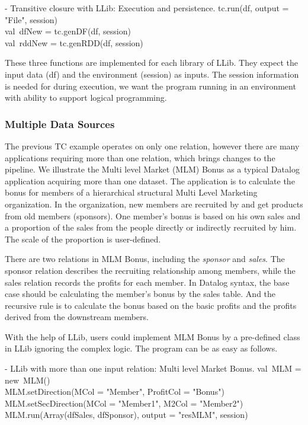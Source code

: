 \vspace{0.5em}
 - Transitive closure with LLib:  Execution and persistence.
\bldl
tc.run(df, output = "File", session) \\
val\ dfNew = tc.genDF(df, session) \\
val\ rddNew = tc.genRDD(df, session) \\

\eldl


These three functions are implemented for each library of LLib. They expect the input data (df) and the environment (session) as inputs.  The session information is needed for during execution, we want the program running in an environment with ability to support logical
programming. 


\subsubsection{Multiple Data Sources}
\label{sec:multiple}
The previous TC example operates on only one relation, however there are many applications requiring more than one relation, which brings changes to the  pipeline. We illustrate the Multi level Market (MLM) Bonus as a typical Datalog application \citep{mlm} acquiring more than one dataset. The application is to calculate the bonus for members of a hierarchical structural Multi Level Marketing  organization. In the organization,  new members are recruited by  and get products from old members (sponsors). One member's bonus is based on his own sales and a proportion of the sales from the people directly or indirectly recruited by him. The  scale of the proportion is user-defined. 

There are two relations in MLM Bonus, including the \textit{sponsor} and \textit{sales}. The sponsor relation describes the recruiting relationship among members, while the sales relation records the profits for each member. In  Datalog syntax, the base case should be calculating the member's bonus by the sales table. And the recursive rule is to calculate the bonus based on the basic profits and the profits derived from the downstream members.

With the help of LLib, users could implement MLM Bonus by a pre-defined class in LLib  ignoring the complex logic. The program can be as easy as  follows.

\vspace{0.5em}
 - LLib with more than one input relation: Multi level Market Bonus.
\bldl
val\ MLM = new\ MLM() \\
MLM.setDirection(MCol = "Member", ProfitCol = "Bonus")\\
MLM.setSecDirection(MCol = "Member1", M2Col = "Member2") \\
MLM.run(Array(dfSales, dfSponsor), output = "resMLM", session) \\

